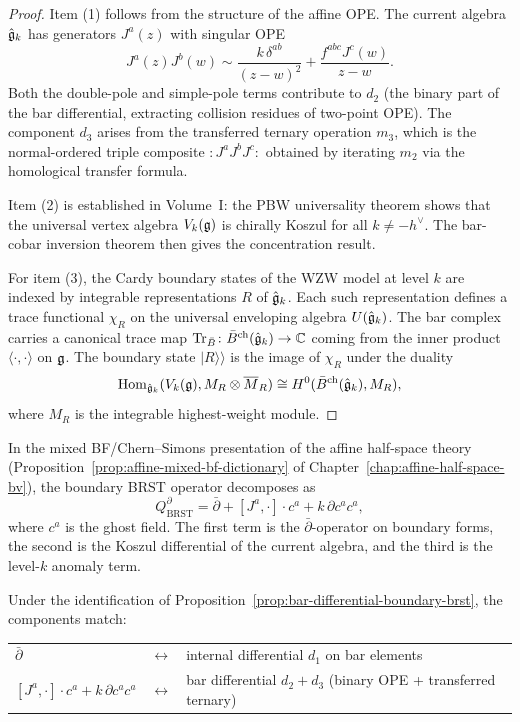 \begin{proof}
Item (1) follows from the structure of the affine OPE. The current
algebra $\hat{\mathfrak{g}}_k$ has generators $J^a(z)$ with singular OPE
\[
J^a(z) J^b(w) \sim
 \frac{k \, \delta^{ab}}{(z-w)^2}
 + \frac{f^{abc} J^c(w)}{z-w}.
\]
Both the double-pole and simple-pole terms contribute to $d_2$
(the binary part of the bar differential, extracting collision
residues of two-point OPE). The component $d_3$ arises from the
transferred ternary operation $m_3$, which is the normal-ordered
triple composite $:J^a J^b J^c:$ obtained by iterating $m_2$
via the homological transfer formula.

Item (2) is established in Volume~I: the PBW universality theorem shows
that the universal vertex algebra $V_k(\mathfrak{g})$ is chirally Koszul for all
$k \neq -h^\vee$. The bar-cobar inversion theorem then gives the
concentration result.

For item (3), the Cardy boundary states of the WZW model at level $k$
are indexed by integrable representations $R$ of $\hat{\mathfrak{g}}_k$. Each
such representation defines a trace functional $\chi_R$ on the
universal enveloping algebra $U(\hat{\mathfrak{g}}_k)$. The bar complex carries
a canonical trace map $\operatorname{Tr}_{\bar{B}} \colon \bar{B}^{\mathrm{ch}}(\hat{\mathfrak{g}}_k) \to \mathbb{C}$
coming from the inner product $\langle \cdot, \cdot \rangle$ on $\mathfrak{g}$.
The boundary state $|R\rangle\!\rangle$ is the image of $\chi_R$ under
the duality
\[
\operatorname{Hom}_{\hat{\mathfrak{g}}_k}(V_k(\mathfrak{g}), M_R \otimes \overline{M}_R)
 \cong H^0(\bar{B}^{\mathrm{ch}}(\hat{\mathfrak{g}}_k), M_R),
\]
where $M_R$ is the integrable highest-weight module.
\end{proof}

\begin{proposition}
In the mixed BF/Chern--Simons presentation of the affine half-space
theory (Proposition~\ref*{prop:affine-mixed-bf-dictionary} of
Chapter~\ref{chap:affine-half-space-bv}), the boundary BRST operator
decomposes as
\[
Q_{\mathrm{BRST}}^\partial
 = \bar{\partial} + [J^a, \cdot] \cdot c^a + k \, \partial c^a c^a,
\]
where $c^a$ is the ghost field. The first term is the
$\bar{\partial}$-operator on boundary forms, the second is the Koszul
differential of the current algebra, and the third is the level-$k$
anomaly term.

Under the identification of
Proposition~\ref{prop:bar-differential-boundary-brst}, the components
match:
\begin{center}
\begin{tabular}{lcl}
$\bar{\partial}$ & $\longleftrightarrow$ & internal differential $d_1$
 on bar elements \\
$[J^a, \cdot] \cdot c^a + k \, \partial c^a c^a$
 & $\longleftrightarrow$ & bar differential
 $d_2 + d_3$ (binary OPE + transferred ternary)
\end{tabular}
\end{center}
\end{proposition}

